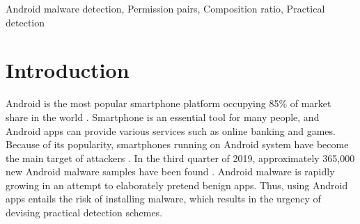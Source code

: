 \documentclass{ieeeaccess}
\begin{document}
\begin{keywords} 
 Android malware detection, Permission pairs, Composition ratio, Practical detection 
 \end{keywords}

\titlepgskip=-15pt

\maketitle

\section{Introduction}  \label{sec:introduction}
Android is the most popular smartphone platform occupying 85\% of market share in the world \cite{idc}.
Smartphone is an essential tool for many people, and Android apps can provide various services such as online banking and games.
Because of its popularity, smartphones running on Android system have become the main target of attackers \cite{saracino2016madam}.
In the third quarter of 2019, approximately 365,000 new Android malware samples have been found \cite{wang2020review}.
Android malware is rapidly growing in an attempt to elaborately pretend benign apps.
Thus, using Android apps entails the risk of installing malware, which results in the urgency of devising practical detection schemes.
\end{document}
